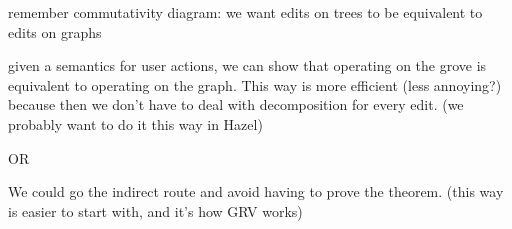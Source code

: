 remember commutativity diagram: we want edits on trees to be equivalent to edits on graphs

given a semantics for user actions, we can show that operating on the grove is equivalent to operating on the graph.
This way is more efficient (less annoying?) because then we don't have to deal with decomposition for every edit.
(we probably want to do it this way in Hazel)

OR

We could go the indirect route and avoid having to prove the theorem.
(this way is easier to start with, and it's how GRV works)



